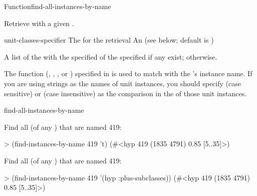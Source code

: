 \documentclass[10pt,twoside,english,pdftex]{article}
\begin{document}

\begin{functiondoc}{Function}{find-all-instances-by-name}%
  {
      
    \returns{} } 
%
%
%

\fnsyntax

\fnpurpose Retrieve  with a given .

\fnpackage {}

\fnmodule {}

\fnargs
\begin{args}{unit-classes-specifier}
 The  for the retrieval
 An 
(see below; default is )
\end{args}

\fnreturns A list of the  with the specified
 of the specified  if any exist; \nil{} otherwise.

\fndsyntax
\W\supp\tabletop
\unitclassspec
\subclassingspec

\fndescription The  function (,
, , or ) specified in
\textbf{} is used to match 
with the 's instance name.  If you are using strings as
the names of unit instances, you should specify  (case sensitive)
or  (case insensitive) as the comparison  in the
 of those unit instances.

\begin{alsos}{find-all-instances-by-name}
\end{alsos}

\fnexamples
Find all  (of any ) that are named
419:
%
\W\supp
\begin{example}
> (find-instances-by-name 419 't)
(#<hyp 419 (1835 4791) 0.85 [5..35]>)
\end{example}
%
Find all  (of any ) that are named
419:
%
\W\supp\notpretop
\begin{example}
> (find-instances-by-name 419 '(hyp :plus-subclasses))
(#<hyp 419 (1835 4791) 0.85 [5..35]>)
\end{example}

\end{functiondoc}
\end{document}
